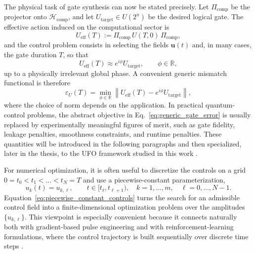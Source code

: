 The physical task of gate synthesis can now be stated precisely. Let $\Pi_{\mathrm{comp}}$ be the projector onto $\mathcal{H}_{\mathrm{comp}}$, and let $U_{\mathrm{target}}\in U(2^n)$ be the desired logical gate. The effective action induced on the computational sector is
\begin{equation}
U_{\mathrm{eff}}(T)
:=
\Pi_{\mathrm{comp}}\, U(T,0)\, \Pi_{\mathrm{comp}},
\label{eq:effective_logical_propagator}
\end{equation}
and the control problem consists in selecting the fields $\mathbf{u}(t)$ and, in many cases, the gate duration $T$, so that
\begin{equation}
U_{\mathrm{eff}}(T)
\approx
e^{i\phi} U_{\mathrm{target}},
\qquad
\phi\in\mathbb{R},
\label{eq:gate_implementation_condition}
\end{equation}
up to a physically irrelevant global phase. A convenient generic mismatch functional is therefore
\begin{equation}
\varepsilon_U(T)
=
\min_{\phi\in\mathbb{R}}
\left\|
U_{\mathrm{eff}}(T)-e^{i\phi}U_{\mathrm{target}}
\right\|,
\label{eq:generic_gate_error}
\end{equation}
where the choice of norm depends on the application. In practical quantum-control problems, the abstract objective in Eq.~\eqref{eq:generic_gate_error} is usually replaced by experimentally meaningful figures of merit, such as gate fidelity, leakage penalties, smoothness constraints, and runtime penalties. These quantities will be introduced in the following paragraphs and then specialized, later in the thesis, to the UFO framework studied in this work \cite{Koch2022,Niu2019}.

For numerical optimization, it is often useful to discretize the controls on a grid
\(
0=t_0<t_1<\dots<t_N=T
\)
and use a piecewise-constant parameterization,
\begin{equation}
u_k(t)=u_{k,\ell},
\qquad
t\in[t_\ell,t_{\ell+1}),
\quad
k=1,\dots,m,
\quad
\ell=0,\dots,N-1.
\label{eq:piecewise_constant_controls}
\end{equation}
Equation~\eqref{eq:piecewise_constant_controls} turns the search for an admissible control field into a finite-dimensional optimization problem over the amplitudes $\{u_{k,\ell}\}$. This viewpoint is especially convenient because it connects naturally both with gradient-based pulse engineering and with reinforcement-learning formulations, where the control trajectory is built sequentially over discrete time steps \cite{Palao2003,Koch2022,Niu2019}.

